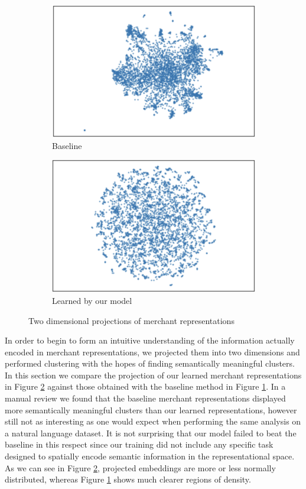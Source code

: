 \documentclass{article}
\begin{document}
\begin{figure}
\centering
\begin{subfigure}{.5\textwidth}
  \centering
  \includegraphics[width=.6\linewidth]{gensim-proj}
  \caption{Baseline}
  \label{gensim-proj}
\end{subfigure}%
\begin{subfigure}{.5\textwidth}
  \centering
  \includegraphics[width=.6\linewidth]{merch-rep-proj}
  \caption{Learned by our model}
  \label{merch-rep-proj}
\end{subfigure}
\caption{Two dimensional projections of merchant representations}
\label{projections}
\end{figure}


In order to begin to form an intuitive understanding of the information actually encoded in merchant representations, we projected them into two dimensions and performed clustering with the hopes of finding semantically meaningful clusters. In this section we compare the projection of our learned merchant representations in Figure \ref{merch-rep-proj} against those obtained with the baseline method in Figure \ref{gensim-proj}. In a manual review we found that the baseline merchant representations displayed more semantically meaningful clusters than our learned representations, however still not as interesting as one would expect when performing the same analysis on a natural language dataset. It is not surprising that our model failed to beat the baseline in this respect since our training did not include any specific task designed to spatially encode semantic information in the representational space. As we can see in Figure \ref{merch-rep-proj}, projected embeddings are more or less normally distributed, whereas Figure \ref{gensim-proj} shows much clearer regions of density. 
\end{document}
